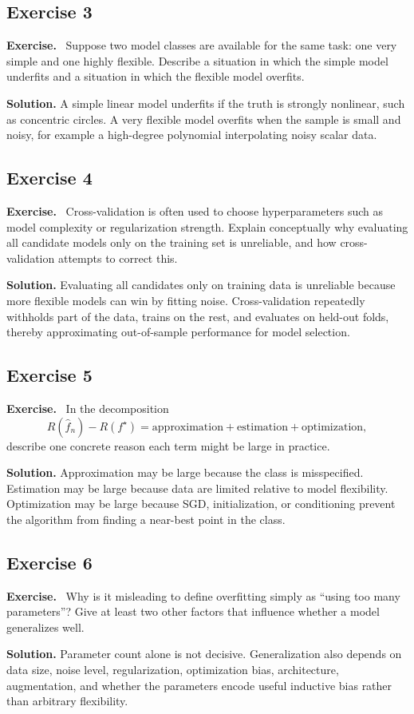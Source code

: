 \documentclass[11pt]{article}
\newenvironment{exercisebox}{\begin{framed}\noindent\textbf{Exercise.}\ }{\end{framed}}
\begin{document}
\subsection*{Exercise 3}
\begin{exercisebox}
Suppose two model classes are available for the same task: one very simple and one highly flexible. Describe a situation in which the simple model underfits and a situation in which the flexible model overfits.
\end{exercisebox}
\textbf{Solution.} A simple linear model underfits if the truth is strongly nonlinear, such as concentric circles. A very flexible model overfits when the sample is small and noisy, for example a high-degree polynomial interpolating noisy scalar data.

\subsection*{Exercise 4}
\begin{exercisebox}
Cross-validation is often used to choose hyperparameters such as model complexity or regularization strength. Explain conceptually why evaluating all candidate models only on the training set is unreliable, and how cross-validation attempts to correct this.
\end{exercisebox}
\textbf{Solution.} Evaluating all candidates only on training data is unreliable because more flexible models can win by fitting noise. Cross-validation repeatedly withholds part of the data, trains on the rest, and evaluates on held-out folds, thereby approximating out-of-sample performance for model selection.

\subsection*{Exercise 5}
\begin{exercisebox}
In the decomposition
\[
R(\hat f_n)-R(f^\star)
=
\text{approximation}+\text{estimation}+\text{optimization},
\]
describe one concrete reason each term might be large in practice.
\end{exercisebox}
\textbf{Solution.} Approximation may be large because the class is misspecified. Estimation may be large because data are limited relative to model flexibility. Optimization may be large because SGD, initialization, or conditioning prevent the algorithm from finding a near-best point in the class.

\subsection*{Exercise 6}
\begin{exercisebox}
Why is it misleading to define overfitting simply as ``using too many parameters''? Give at least two other factors that influence whether a model generalizes well.
\end{exercisebox}
\textbf{Solution.} Parameter count alone is not decisive. Generalization also depends on data size, noise level, regularization, optimization bias, architecture, augmentation, and whether the parameters encode useful inductive bias rather than arbitrary flexibility.
\end{document}

